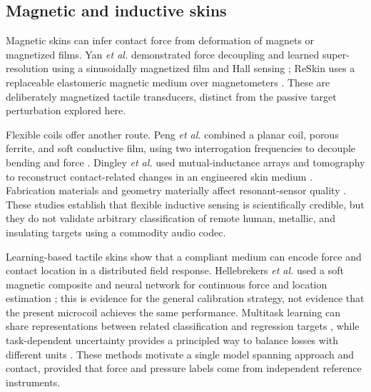 \documentclass[10pt]{article}
\begin{document}
\subsection{Magnetic and inductive skins}
Magnetic skins can infer contact force from deformation of magnets or magnetized films. Yan \emph{et al.} demonstrated force decoupling and learned super-resolution using a sinusoidally magnetized film and Hall sensing \citep{yan2021magnetic}; ReSkin uses a replaceable elastomeric magnetic medium over magnetometers \citep{bhirangi2022reskin}. These are deliberately magnetized tactile transducers, distinct from the passive target perturbation explored here.

Flexible coils offer another route. Peng \emph{et al.} combined a planar coil, porous ferrite, and soft conductive film, using two interrogation frequencies to decouple bending and force \citep{peng2024inductive}. Dingley \emph{et al.} used mutual-inductance arrays and tomography to reconstruct contact-related changes in an engineered skin medium \citep{dingley2023emskin}. Fabrication materials and geometry materially affect resonant-sensor quality \citep{wang2020resonant}. These studies establish that flexible inductive sensing is scientifically credible, but they do not validate arbitrary classification of remote human, metallic, and insulating targets using a commodity audio codec.

Learning-based tactile skins show that a compliant medium can encode force and contact location in a distributed field response. Hellebrekers \emph{et al.} used a soft magnetic composite and neural network for continuous force and location estimation \citep{hellebrekers2020force}; this is evidence for the general calibration strategy, not evidence that the present microcoil achieves the same performance. Multitask learning can share representations between related classification and regression targets \citep{caruana1997multitask}, while task-dependent uncertainty provides a principled way to balance losses with different units \citep{kendall2018uncertainty}. These methods motivate a single model spanning approach and contact, provided that force and pressure labels come from independent reference instruments.
\end{document}

